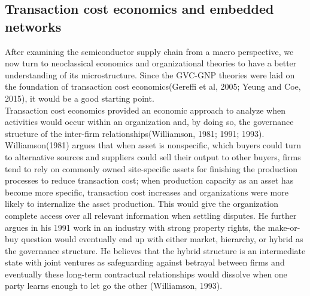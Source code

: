 \documentclass[12pt]{article}
\begin{document}
    \subsection*{\centering Transaction cost economics and embedded networks}
\textbf{}
\indent After examining the semiconductor supply chain from a macro perspective, we now turn to neoclassical economics and organizational theories to have a better understanding of its microstructure. Since the GVC-GNP theories were laid on the foundation of transaction cost economics(Gereffi et al, 2005; Yeung and Coe, 2015), it would be a good starting point.\\
\indent Transaction cost economics provided an economic approach to analyze when activities would occur within an organization and, by doing so, the governance structure of the inter-firm relationships(Williamson, 1981; 1991; 1993). Williamson(1981) argues that when asset is nonspecific, which buyers could turn to alternative sources and suppliers could sell their output to other buyers, firms tend to rely on commonly owned site-specific assets for finishing the production processes to reduce transaction cost; when production capacity as an asset has become more specific, transaction cost increases and organizations were more likely to internalize the asset production. This would give the organization complete access over all relevant information when settling disputes. He further argues in his 1991 work in an industry with strong property rights, the make-or-buy question would eventually end up with either market, hierarchy, or hybrid as the governance structure. He believes that the hybrid structure is an intermediate state with joint ventures as safeguarding against betrayal between firms and eventually these long-term contractual relationships would dissolve when one party learns enough to let go the other (Williamson, 1993).\\
\end{document}
